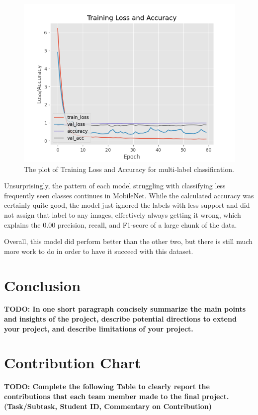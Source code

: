 \documentclass{article}
\theoremstyle{plain}
\theoremstyle{definition}
\theoremstyle{remark}
\begin{document}
\begin{figure}[!h]
    \centering
    \includegraphics[scale=0.5]{final_results}
    \caption{The plot of Training Loss and Accuracy for multi-label classification.}
    \label{fig:trainingloss}
\end{figure}

Unsurprisingly, the pattern of each model struggling with classifying less frequently seen classes
continues in MobileNet. While the calculated accuracy was certainly quite good, the model just
ignored the labels with less support and did not assign that label to any images, effectively always
getting it wrong, which explains the 0.00 precision, recall, and F1-score of a large chunk of the data.

Overall, this model did perform better than the other two, but there is still much more work to do
in order to have it succeed with this dataset.


\section{Conclusion}
\textbf{TODO: In one short paragraph concisely summarize the main points and insights of the project,
describe potential directions to extend your project, and describe limitations of your project.}


\clearpage
\section{Contribution Chart}
\textbf{TODO: Complete the following Table to clearly report the contributions that each team
member made to the final project. (Task/Subtask, Student ID, Commentary on Contribution)}
\end{document}
